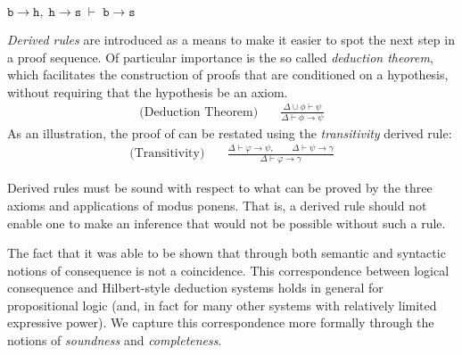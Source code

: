 \begin{theorem}
     \label{theorem:deduction-proof} 

\(
  \texttt{b} \rightarrow \texttt{h},\;
  \texttt{h} \rightarrow \texttt{s}
  \;\vdash\;
  \texttt{b} \rightarrow \texttt{s}
\)
\end{theorem}
%
\begin{proofH}
\end{proofH} 

\textit{Derived rules} are introduced as a means to make it easier to spot the next step in a proof sequence. Of particular importance is the so called \textit{deduction theorem}, which facilitates the construction of proofs that are conditioned on a hypothesis, without requiring that the hypothesis be an axiom.  
%
\begin{align}
     \text{(Deduction Theorem)} \quad & \frac{\Delta \cup \phi \vdash \psi}{\Delta \vdash \phi \rightarrow \psi}
\end{align}
%
As an illustration, the proof of  can be restated using the \textit{transitivity} derived rule:
%
\begin{align}
     \text{(Transitivity)} \quad & \frac{\Delta \vdash \varphi \rightarrow \psi, \qquad \Delta \vdash \psi \rightarrow \gamma}{\Delta \vdash \varphi \rightarrow \gamma}
\end{align}

Derived rules must be sound with respect to what can be proved by the three axioms and applications of modus ponens. That is, a derived rule should not enable one to make an inference that would not be possible without such a rule. 

The fact that it was able to be shown that  through both semantic and syntactic notions of consequence is not a coincidence. This correspondence between logical consequence and Hilbert-style deduction systems holds in general for propositional logic (and, in fact for many other systems with relatively limited expressive power). We capture this correspondence more formally through the notions of \textit{soundness} and \textit{completeness}. 

